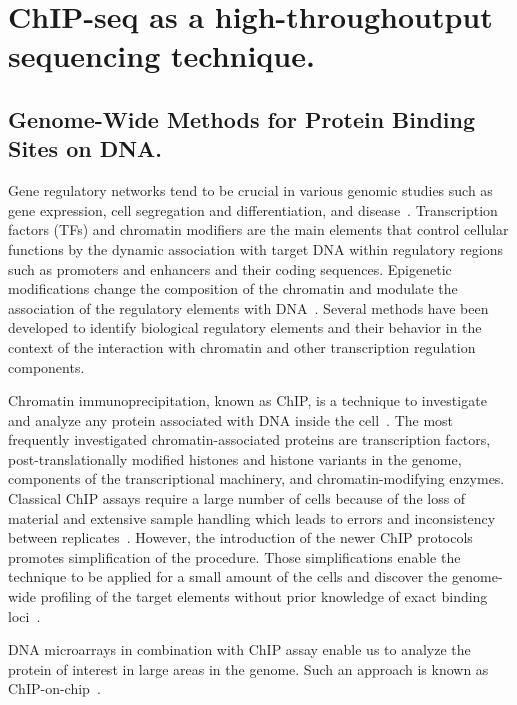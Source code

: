 \chapter{ChIP-seq as a high-throughoutput sequencing technique.}

\section{Genome-Wide Methods for Protein Binding Sites on DNA.}
Gene regulatory networks tend to be crucial in various genomic studies such as gene expression, cell segregation and differentiation, and disease~\cite{collas2010current}. 
Transcription factors (TFs) and chromatin modifiers are the main elements that control cellular functions by the dynamic association with target DNA within regulatory regions such as promoters and enhancers and their coding sequences.
Epigenetic modifications change the composition of the chromatin and modulate the association of the regulatory elements with DNA~\cite{antequera2003structure, kouzarides2007chromatin, mito2007histone}.
Several methods have been developed to identify biological regulatory elements and their behavior in the context of the interaction with chromatin and other transcription regulation components. 

Chromatin immunoprecipitation, known as ChIP, is a technique to investigate and analyze any protein associated with DNA inside the cell~\cite{o1995histone, o1996immunoprecipitation, nelson2006protocol}.
The most frequently investigated chromatin-associated proteins are transcription factors, post-translationally modified histones and histone variants in the genome, components of the transcriptional machinery, and chromatin-modifying enzymes.
Classical ChIP assays require a large number of cells because of the loss of material and extensive sample handling which leads to errors and inconsistency between replicates~\cite{o1996immunoprecipitation}. 
However, the introduction of the newer ChIP protocols promotes simplification of the procedure. 
Those simplifications enable the technique to be applied for a small amount of the cells and discover the genome-wide profiling of the target elements without prior knowledge of exact binding loci~\cite{collas2010current}. 

DNA microarrays in combination with ChIP assay enable us to analyze the protein of interest in large areas in the genome. 
Such an approach is known as ChIP-on-chip~\cite{ren2000genome, loden2005whole}. 













